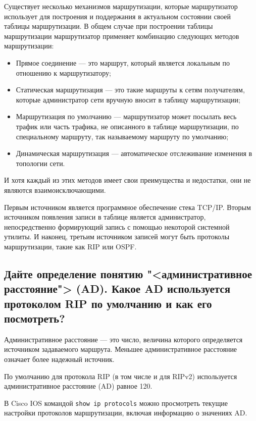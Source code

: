 Существует несколько механизмов маршрутизации,
которые маршрутизатор использует для построения
и поддержания в актуальном состоянии своей таблицы маршрутизации.
В общем случае при построении таблицы маршрутизации маршрутизатор
применяет комбинацию следующих методов маршрутизации:

\begin{itemize}
    \item Прямое соединение --- это маршрут, который является локальным
    по отношению к маршрутизатору;
    \item Статическая маршрутизация --- это такие маршруты к сетям получателям,
    которые администратор сети вручную вносит в таблицу маршрутизации;
    \item Маршрутизация по умолчанию --- маршрутизатор может посылать
    весь трафик или часть трафика, не описанного в таблице маршрутизации,
    по специальному маршруту, так называемому маршруту по умолчанию;
    \item Динамическая маршрутизация --- автоматическое отслеживание
    изменения в топологии сети.
\end{itemize}

И хотя каждый из этих методов имеет свои преимущества и недостатки,
они не являются взаимоисключающими.\par
Первым источником является программное обеспечение стека TCP/IP.
Вторым источником появления записи в таблице является администратор,
непосредственно формирующий запись с помощью некоторой системной утилиты.
И наконец, третьим источником записей могут быть протоколы маршрутизации,
такие как RIP или OSPF.

\subsection{Дайте определение понятию "<административное расстояние"> (AD).
Какое AD используется протоколом RIP по умолчанию и как его посмотреть?}

Административное расстояние --- это число,
величина которого определяется источником задаваемого маршрута.
Меньшее административное расстояние означает более надежный источник.\par
По умолчанию для протокола RIP (в том числе и для RIPv2)
используется административное расстояние (AD) равное 120.\par
В Cisco IOS командой \texttt{show ip protocols} можно просмотреть
текущие настройки протоколов маршрутизации, включая информацию о значениях AD.

